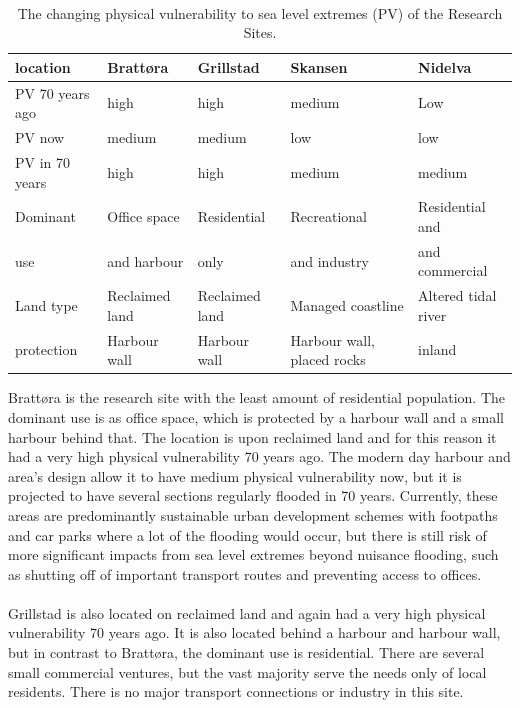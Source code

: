 \paragraph{}
\begin{table}[!ht]
    \centering
    \begin{tabular}{|l|l|l|l|l|}
    \hline
        location & Brattøra & Grillstad & Skansen  & Nidelva \\ \hline
        PV 70 years ago & high & high & medium & Low \\ \hline
        PV now &  medium &  medium &  low &  low \\ \hline
        PV in 70 years &  high &  high &  medium &  medium \\ \hline
        Dominant & Office space  & Residential & Recreational  & Residential and \\ \newline
        use & and harbour &  only   &  and industry & and commercial  \\ \hline
        Land type & Reclaimed land & Reclaimed land & Managed coastline  & Altered tidal river \\ \hline
        protection & Harbour wall & Harbour wall & Harbour wall, placed rocks & inland \\ \hline
    \end{tabular}
    \caption{The changing physical vulnerability to sea level extremes (PV) of the Research Sites.}
    \label{table:research-sites}
\end{table}

Brattøra is the research site with the least amount of residential population. The dominant use is as office space, which is protected by a harbour wall and a small harbour behind that. The location is upon reclaimed land and for this reason it had a very high physical vulnerability 70 years ago. The modern day harbour and area's design allow it to have medium physical vulnerability now, but it is projected to have several sections regularly flooded in 70 years. Currently, these areas are predominantly sustainable urban development schemes with footpaths and car parks where a lot of the flooding would occur, but there is still risk of more significant impacts from sea level extremes beyond nuisance flooding, such as shutting off of important transport routes and preventing access to offices.
\paragraph{}
Grillstad is also located on reclaimed land and again had a very high physical vulnerability 70 years ago. It is also located behind a harbour and harbour wall, but in contrast to  Brattøra, the dominant use is residential. There are several small commercial ventures, but the vast majority serve the needs only of local residents. There is no major transport connections or industry in this site. 
